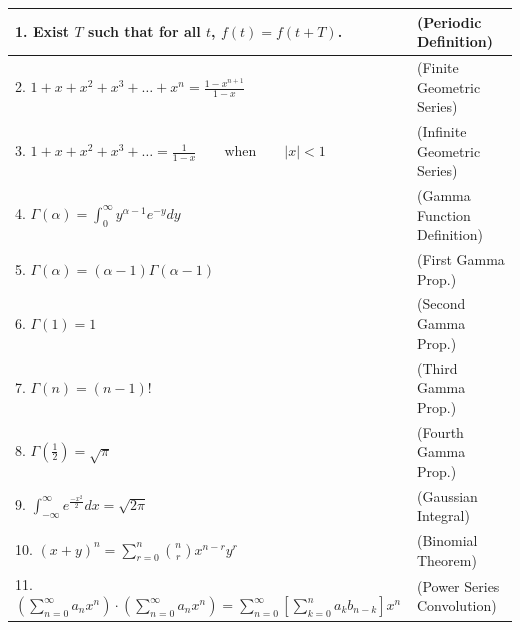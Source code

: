 \documentclass[12pt]{article}
\begin{document}
\begin{table}
\small
    \begin{tabular}{|l|l|}
    \hline
    1. Exist $T$ such that for all $t$, $f(t)=f(t+T)$. & (Periodic Definition) \\
    \hline \hline
    2. $1+x+x^2+x^3+\ldots+x^n=\frac{1-x^{n+1}}{1-x}$ & (Finite Geometric Series) \\
    \hline \hline
    3. $1+x+x^2+x^3+\ldots= \frac{1}{1-x} \qquad \text{when} \qquad |x|<1$ & (Infinite Geometric Series) \\
    \hline \hline
    4. $\Gamma(\alpha)=\int_{0}^{\infty}y^{\alpha-1}e^{-y}dy$ & (Gamma Function Definition) \\
    \hline \hline
    5. $\Gamma(\alpha) = (\alpha -1) \Gamma(\alpha -1)$ & (First Gamma Prop.)  \\
    \hline \hline
    6. $\Gamma(1)=1$ & (Second Gamma Prop.) \\
    \hline \hline
    7. $\Gamma(n) = (n-1)!$ & (Third Gamma Prop.)  \\
    \hline \hline
    8. $\Gamma\left(\frac{1}{2}\right)=\sqrt{\pi}$ & (Fourth Gamma Prop.) \\
    \hline \hline
    9. $\int_{-\infty}^{\infty} e^{\frac{-x^2}{2}} dx=\sqrt{2\pi}$ & (Gaussian Integral)  \\
    \hline \hline
    10. $(x+y)^n = \sum_{r=0}^{n} \binom{n}{r} x^{n-r}y^r$  & (Binomial Theorem) \\
    \hline \hline
    11. $\left(\sum_{n=0}^{\infty} a_n x^n\right)\cdot \left(\sum_{n=0}^{\infty} a_n x^n\right)=\sum_{n=0}^{\infty} \left[\sum_{k=0}^n a_{k}b_{n-k}\right] x^n$ & (Power Series Convolution) \\
    \hline
    \end{tabular}
\end{table}
    
\end{document}
